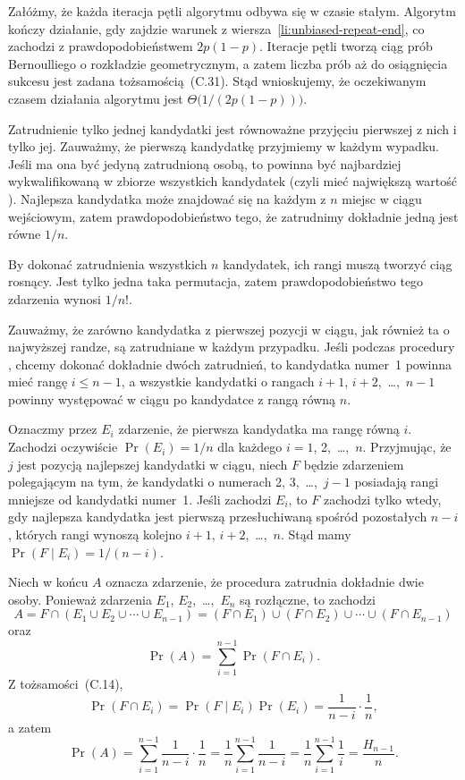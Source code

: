 Załóżmy, że każda iteracja pętli algorytmu odbywa się w czasie stałym. Algorytm kończy działanie, gdy zajdzie warunek z wiersza~\ref{li:unbiased-repeat-end}, co zachodzi z prawdopodobieństwem $2p(1-p)$. Iteracje pętli tworzą ciąg prób Bernoulliego o rozkładzie geometrycznym, a zatem liczba prób aż do osiągnięcia sukcesu jest zadana tożsamością~(C.31). Stąd wnioskujemy, że oczekiwanym czasem działania algorytmu jest $\Theta\bigl(1/(2p(1-p))\bigr)$.


\exercise %
Zatrudnienie tylko jednej kandydatki jest równoważne przyjęciu pierwszej z nich i tylko jej. Zauważmy, że pierwszą kandydatkę przyjmiemy w każdym wypadku. Jeśli ma ona być jedyną zatrudnioną osobą, to powinna być najbardziej wykwalifikowaną w zbiorze wszystkich kandydatek (czyli mieć największą wartość ). Najlepsza kandydatka może znajdować się na każdym z $n$ miejsc w ciągu wejściowym, zatem prawdopodobieństwo tego, że zatrudnimy dokładnie jedną jest równe $1/n$.

By dokonać zatrudnienia wszystkich $n$ kandydatek, ich rangi muszą tworzyć ciąg rosnący. Jest tylko jedna taka permutacja, zatem prawdopodobieństwo tego zdarzenia wynosi $1/n!$.

\exercise %
Zauważmy, że zarówno kandydatka z pierwszej pozycji w ciągu, jak również ta o najwyższej randze, są zatrudniane w każdym przypadku. Jeśli podczas procedury , chcemy dokonać dokładnie dwóch zatrudnień, to kandydatka numer~1 powinna mieć rangę $i\le n-1$, a wszystkie kandydatki o rangach $i+1$, $i+2$,~\dots,~$n-1$ powinny występować w ciągu po kandydatce z rangą równą $n$.

Oznaczmy przez $E_i$ zdarzenie, że pierwsza kandydatka ma rangę równą $i$. Zachodzi oczywiście $\Pr(E_i)=1/n$ dla każdego $i=1$, 2,~\dots,~$n$. Przyjmując, że $j$ jest pozycją najlepszej kandydatki w ciągu, niech $F$ będzie zdarzeniem polegającym na tym, że kandydatki o numerach 2, 3,~\dots,~$j-1$ posiadają rangi mniejsze od kandydatki numer~1. Jeśli zachodzi $E_i$, to $F$ zachodzi tylko wtedy, gdy najlepsza kandydatka jest pierwszą przesłuchiwaną spośród pozostałych $n-i$, których rangi wynoszą kolejno $i+1$, $i+2$,~\dots,~$n$. Stąd mamy $\Pr(F\mid E_i)=1/(n-i)$.

Niech w końcu $A$ oznacza zdarzenie, że procedura  zatrudnia dokładnie dwie osoby. Ponieważ zdarzenia $E_1$, $E_2$,~\dots,~$E_n$ są rozłączne, to zachodzi
\[
	A = F\cap(E_1\cup E_2\cup\cdots\cup E_{n-1}) = (F\cap E_1)\cup(F\cap E_2)\cup\cdots\cup(F\cap E_{n-1})
\]
oraz
\[
	\Pr(A) = \sum_{i=1}^{n-1}\Pr(F\cap E_i).
\]
Z tożsamości~(C.14),
\[
	\Pr(F\cap E_i) = \Pr(F\mid E_i)\Pr(E_i) = \frac{1}{n-i}\cdot\frac{1}{n},
\]
a zatem
\[
	\Pr(A) = \sum_{i=1}^{n-1}\frac{1}{n-i}\cdot\frac{1}{n} = \frac{1}{n}\sum_{i=1}^{n-1}\frac{1}{n-i} = \frac{1}{n}\sum_{i=1}^{n-1}\frac{1}{i} = \frac{H_{n-1}}{n}.
\]

